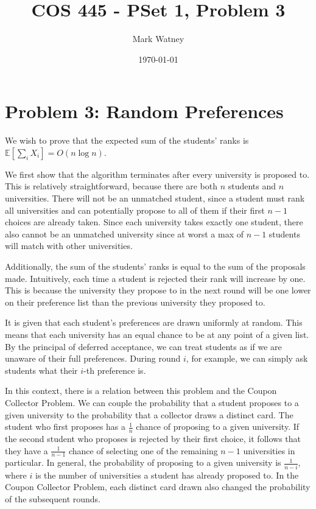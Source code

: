 \documentclass[12pt]{article}%
\begin{document}
\title{COS 445 - PSet 1, Problem 3} %
\author{Mark Watney} %
\date{\today}
\maketitle
\section*{Problem 3: Random Preferences}
We wish to prove that the expected sum of the students' ranks is $\mathbb{E}[\sum_i X_i] = O(n \log n)$.

We first show that the algorithm terminates after every university is proposed to. This is relatively straightforward, because there are both $n$ students and $n$ universities. There will not be an unmatched student, since a student must rank all universities and can potentially propose to all of them if their first $n - 1$ choices are already taken. Since each university takes exactly one student, there also cannot be an unmatched university since at worst a max of $n - 1$ students will match with other universities.

Additionally, the sum of the students' ranks is equal to the sum of the proposals made. Intuitively, each time a student is rejected their rank will increase by one. This is because the university they propose to in the next round will be one lower on their preference list than the previous university they proposed to.

It is given that each student's preferences are drawn uniformly at random. This means that each university has an equal chance to be at any point of a given list. By the principal of deferred acceptance, we can treat students as if we are unaware of their full preferences. During round $i$, for example, we can simply ask students what their $i$-th preference is.

In this context, there is a relation between this problem and the Coupon Collector Problem. We can couple the probability that a student proposes to a given university to the probability that a collector draws a distinct card. The student who first proposes has a $\frac{1}{n}$ chance of proposing to a given university. If the second student who proposes is rejected by their first choice, it follows that they have a $\frac{1}{n - 1}$ chance of selecting one of the remaining $n - 1$ universities in particular. In general, the probability of proposing to a given university is $\frac{1}{n - i}$, where $i$ is the number of universities a student has already proposed to. In the Coupon Collector Problem, each distinct card drawn also changed the probability of the subsequent rounds. 
\end{document}
